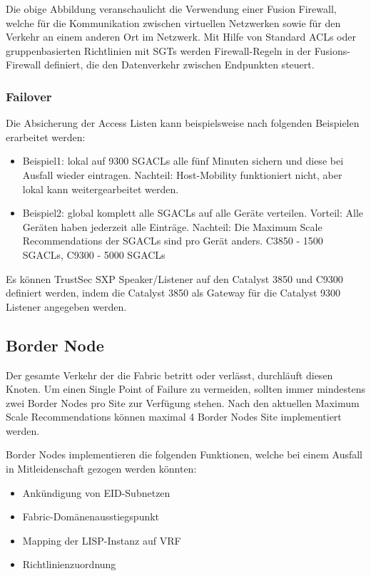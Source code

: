 Die obige Abbildung veranschaulicht die Verwendung einer Fusion Firewall, welche für die Kommunikation zwischen virtuellen Netzwerken sowie für den Verkehr an einem anderen Ort im Netzwerk. Mit Hilfe von Standard ACLs oder gruppenbasierten Richtlinien mit SGTs werden Firewall-Regeln in der Fusions-Firewall definiert, die den Datenverkehr zwischen Endpunkten steuert.

\subsubsection{Failover}
Die Absicherung der Access Listen kann beispielsweise nach folgenden Beispielen erarbeitet werden:

\begin{itemize}
	\item Beispiel1: lokal auf 9300 SGACLs alle fünf Minuten sichern und diese bei Ausfall wieder eintragen. Nachteil: Host-Mobility funktioniert nicht, aber lokal kann weitergearbeitet werden.
	\item Beispiel2: global komplett alle SGACLs auf alle Geräte verteilen. Vorteil: Alle Geräten haben jederzeit alle Einträge. Nachteil: Die Maximum Scale Recommendations der SGACLs sind pro Gerät anders. C3850 - 1500 SGACLs, C9300 - 5000 SGACLs
\end{itemize}

Es können TrustSec SXP Speaker/Listener auf den Catalyst 3850 und C9300 definiert werden, indem die Catalyst 3850 als Gateway für die Catalyst 9300 Listener angegeben werden.

\subsection{Border Node}

Der gesamte Verkehr der die Fabric betritt oder verlässt, durchläuft diesen Knoten. Um einen Single Point of Failure zu vermeiden, sollten immer mindestens zwei Border Nodes pro Site zur Verfügung stehen. Nach den aktuellen Maximum Scale Recommendations können maximal 4 Border Nodes Site implementiert werden.

Border Nodes implementieren die folgenden Funktionen, welche bei einem Ausfall in Mitleidenschaft gezogen werden könnten\cite{sda-designguide-sept2018}:
\begin{itemize}
	\item Ankündigung von EID-Subnetzen
	\item Fabric-Domänenausstiegspunkt
	\item Mapping der LISP-Instanz auf VRF
	\item Richtlinienzuordnung
\end{itemize}

